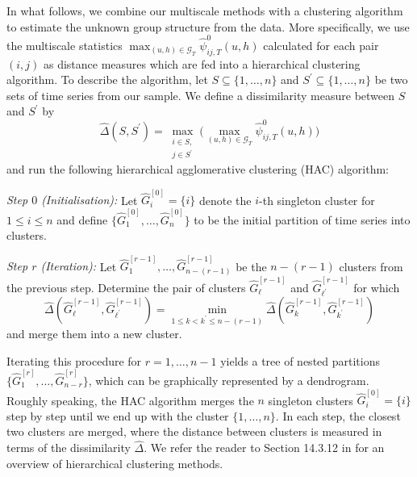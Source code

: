 \documentclass[12pt]{article}
\begin{document}
In what follows, we combine our multiscale methods with a clustering algorithm to estimate the unknown group structure from the data. More specifically, we use the multiscale statistics $\max_{(u, h) \in \mathcal{G}_T}\widehat{\psi}^0_{ij, T}(u, h)$ calculated for each pair $(i,j)$ as distance measures which are fed into a hierarchical clustering algorithm. To describe the algorithm, let $S \subseteq \{1,\ldots, n\}$ and $S^\prime \subseteq \{1,\ldots, n\}$ be two sets of time series from our sample. We define a dissimilarity measure between $S$ and $S^\prime$ by 
\begin{equation}\label{dissimilarity}
\widehat{\Delta}(S,S^\prime) = \max_{\substack{i \in S, \\ j \in S^\prime}} \Big(\max_{(u, h) \in \mathcal{G}_T}\widehat{\psi}^0_{ij, T}(u, h)\Big) 
\end{equation}
and run the following hierarchical agglomerative clustering (HAC) algorithm: 
\vspace{3pt}

\noindent \textit{Step $0$ (Initialisation):} Let $\widehat{G}_i^{[0]} = \{ i \}$ denote the $i$-th singleton cluster for $1 \le i \le n$ and define $\{\widehat{G}_1^{[0]},\ldots,\widehat{G}_n^{[0]} \}$ to be the initial partition of time series into clusters. 

\noindent \textit{Step $r$ (Iteration):} Let $\widehat{G}_1^{[r-1]},\ldots,\widehat{G}_{n-(r-1)}^{[r-1]}$ be the $n-(r-1)$ clusters from the previous step. Determine the pair of clusters $\widehat{G}_{\ell}^{[r-1]}$ and $\widehat{G}_{{\ell}^\prime}^{[r-1]}$ for which 
\[ \widehat{\Delta}(\widehat{G}_{\ell}^{[r-1]},\widehat{G}_{{\ell}^\prime}^{[r-1]}) = \min_{1 \le k < k^\prime \le n-(r-1)} \widehat{\Delta}(\widehat{G}_{k}^{[r-1]},\widehat{G}_{k^\prime}^{[r-1]}) \]  
and merge them into a new cluster. 
\vspace{3pt}

\noindent Iterating this procedure for $r = 1,\ldots, n-1$ yields a tree of nested partitions $\{\widehat{G}_1^{[r]}, \ldots,\widehat{G}_{n-r}^{[r]}\}$, which can be graphically represented by a dendrogram. Roughly speaking, the HAC algorithm merges the $n$ singleton clusters $\widehat{G}_i^{[0]} = \{ i \}$ step by step until we end up with the cluster $\{1,\ldots, n\}$. In each step, the closest two clusters are merged, where the distance between clusters is measured in terms of the dissimilarity $\widehat{\Delta}$. We refer the reader to Section 14.3.12 in \cite{HastieTibshiraniFriedman2009} for an overview of hierarchical clustering methods. 
\end{document}
